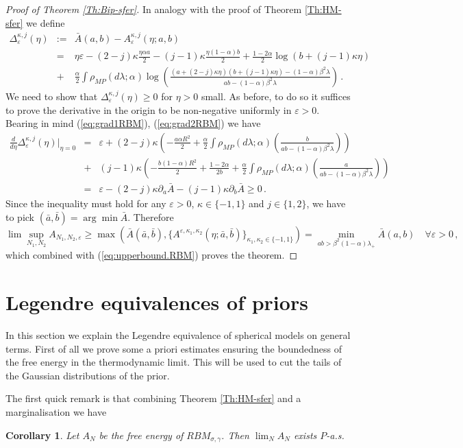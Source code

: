 \documentclass[10pt,oneside,a4paper,reqno]{amsart}  %
\def\bea{\begin{eqnarray}}
\def\eea{\end{eqnarray}}
\def\nn{\nonumber}
\def\a{\alpha}
\def\e{\varepsilon}
\def\g{\gamma}
\def\b{\beta}
\def\D{\Delta}
\def\l{\lambda}
\def\r{\rho}
\def\s{\sigma}
\theoremstyle{plain}
\newtheorem{corollary}[theorem]{Corollary}
\numberwithin{equation}{section}
\begin{document}
\begin{proof}[Proof of Theorem \ref{Th:Bip-sfer}]
In analogy with the proof of Theorem \ref{Th:HM-sfer} we define 
\bea
\D_{\e}^{\kappa,j}(\eta)&:=&\bar A(a,b)-A_\e^{\kappa,j}(\eta; a,b)\nn\\
&=&\eta \e-(2-j)\kappa\frac{\eta\a a}{2}-(j-1)\kappa\frac{\eta(1-\a) b}{2}+\frac{1-2\a}{2}\log(b+(j-1)\kappa\eta)\nn\\
&+&\frac\a2 \int \r_{MP}(d\l;\a)\log\left(\frac{(a+(2-j)\kappa\eta)(b+(j-1)\kappa\eta)- (1-\a)\b^2\l}{ab-(1-\a)\b^2\l}\right)\,.\nn
\eea
We need to show that $\D_{\e}^{\kappa,j}(\eta)\geq0$ for $\eta>0$ small. As before, to do so it suffices to prove the derivative in the origin to be non-negative uniformly in $\e>0$. Bearing in mind (\ref{eq:grad1RBM}), (\ref{eq:grad2RBM}) we have
\bea
\frac{d}{d\eta} \D_{\e}^{\kappa,j}(\eta)\big|_{\eta=0}&=&\e+(2-j)\kappa\left(-\frac{a\a R^2}{2}+\frac\a2 \int \r_{MP}(d\l;\a)\left(\frac{b}{ab-(1-\a)\b^2\l}\right)\right)\nn\\
&+&(j-1)\kappa\left(-\frac{b(1-\a) R^2}{2}+\frac{1-2\a}{2b}+\frac\a2 \int \r_{MP}(d\l;\a)\left(\frac{a}{ab-(1-\a)\b^2\l}\right)\right)\nn\\
&=&\e-(2-j)\kappa\partial_a\bar A-(j-1)\kappa\partial_b\bar A\geq0\,. \nn
\eea
Since the inequality must hold for any $\e>0$, $\kappa\in\{-1,1\}$ and $j\in\{1,2\}$, we have to pick $(\bar a, \bar b)=\arg\min \bar A$. Therefore 
$$
\lim\sup_{N_1,N_2} A_{N_1,N_2,\e}\geq \max(\bar A(\bar a,\bar b), \{A^{\e,\kappa_1,\kappa_2}(\eta; \bar a,\bar b)\}_{\kappa_1,\kappa_2\in\{-1,1\}})= \min_{ab>\b^2(1-\a)\l_+}\bar A( a, b)\quad \forall \e>0\,,
$$
which combined with (\ref{eq:upperbound.RBM}) proves the theorem. 
\end{proof}






\section{Legendre equivalences of priors}\label{section:legendre}

In this section we explain the Legendre equivalence of spherical models on general terms.
First of all we prove some a priori estimates ensuring the boundedness of the free energy in the thermodynamic limit. This will be used to cut the tails of the Gaussian distributions of the prior. 

The first quick remark is that combining Theorem \ref{Th:HM-sfer} and a marginalisation we have
 \begin{corollary}
Let $A_N$ be the free energy of $RBM_{\s,\g}$. Then $\lim_NA_N$ exists $P$-a.s.
 \end{corollary}
\end{document}
